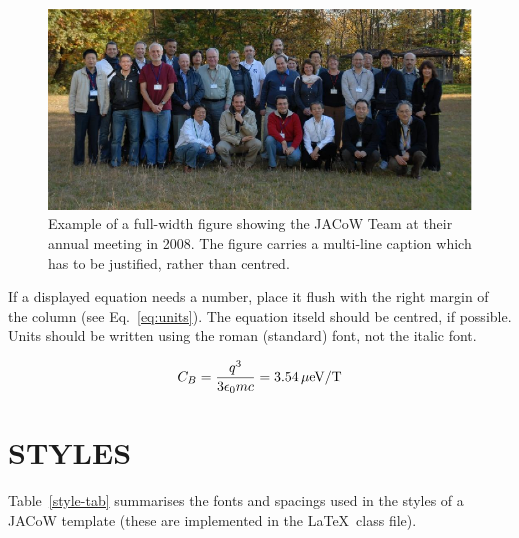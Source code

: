 \documentclass{JAC2003}
\begin{document}
\begin{figure}[tb]
    \centering
    \includegraphics*[width=168mm]{JACpic2v2.eps}
    \caption{Example of a full-width figure showing the JACoW Team at their annual meeting in 2008. 
    The figure carries a multi-line caption which has to be justified, rather than centred.}
    \label{l2ea4-f2}
\end{figure}
\fi

If a displayed equation needs a number, place it flush with the right
margin of the column (see Eq.~\ref{eq:units}). The equation itseld should be centred, if possible.
Units should be written
using the roman (standard) font, not the italic font.

\begin{equation}\label{eq:units}
    C_B={q^3\over 3\epsilon_{0} mc}=3.54\,\hbox{$\mu$eV/T}
\end{equation}

\section{STYLES}

Table~\ref{style-tab} summarises the fonts and spacings used in the styles of
a JACoW template (these are implemented in the \LaTeX\ class file).
\end{document}
